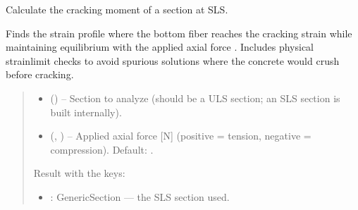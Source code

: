 \documentclass[a4paper,11pt,german]{sphinxmanual}
\begin{document}

\begin{fulllineitems}
\label{\detokenize{api/analysis_core:core.analysis_core.section_methods.calculate_cracking_moment_sls_Nmm_EC}}
\pysigstartsignatures
\pysiglinewithargsret
{}
{\sphinxparamcomma {}}
{}
\pysigstopsignatures
\sphinxAtStartPar
Calculate the cracking moment of a section at SLS.

\sphinxAtStartPar
Finds the strain profile where the bottom fiber reaches the cracking
strain  while maintaining equilibrium with the
applied axial force . Includes physical strain\sphinxhyphen{}limit checks to
avoid spurious solutions where the concrete would crush before cracking.
\begin{quote}\begin{description}
\begin{itemize}
\item {} 
\sphinxAtStartPar
{} () – Section to analyze (should be a ULS section; an SLS section is
built internally).

\item {} 
\sphinxAtStartPar
{} (, ) – Applied axial force {[}N{]} (positive = tension, negative =
compression). Default: .

\end{itemize}

\sphinxAtStartPar

\sphinxAtStartPar
Result with the keys:
\begin{itemize}
\item {} 
\sphinxAtStartPar
{} : GenericSection — the SLS section used.


\end{itemize}
\end{description}
\end{quote}
\end{fulllineitems}
\end{document}
